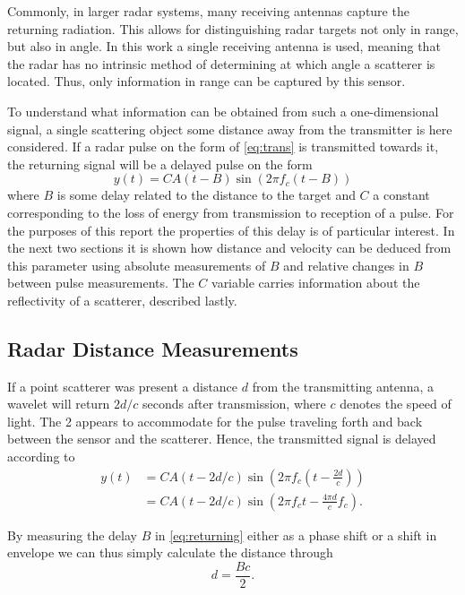 Commonly, in larger radar systems, many receiving antennas capture the returning radiation. This allows for distinguishing radar targets not only in range, but also in angle. In this work a single receiving antenna is used, meaning that the radar has no intrinsic method of determining at which angle a scatterer is located. Thus, only information in range can be captured by this sensor.

To understand what information can be obtained from such a one-dimensional signal, a single scattering object some distance away from the transmitter is here considered. If a radar pulse on the form of \eqref{eq:trans} is transmitted towards it, the returning signal will be a delayed pulse on the form \citep{richards_2014}
\begin{equation}\label{eq:returning}
	y(t) = CA(t-B)\sin(2\pi f_c (t-B))
\end{equation}
where $B$ is some delay related to the distance to the target and $C$ a constant corresponding to the loss of energy from transmission to reception of a pulse. For the purposes of this report the properties of this delay is of particular interest. In the next two sections it is shown how distance and velocity can be deduced from this parameter using absolute measurements of $B$ and relative changes in $B$ between pulse measurements. The $C$ variable carries information about the reflectivity of a scatterer, described lastly. 

\subsection{Radar Distance Measurements}

If a point scatterer was present a distance $d$ from the transmitting antenna, a wavelet will return $2d/c$ seconds after transmission, where $c$ denotes the speed of light. The 2 appears to accommodate for the pulse traveling forth and back between the sensor and the scatterer. Hence, the transmitted signal is delayed according to 
\begin{equation}
	\begin{split}
		y(t) 
		& = CA(t-2d/c)\sin(2\pi f_c(t - \frac{2d}{c})) \\
		& = CA(t-2d/c)\sin(2\pi f_ct - \frac{4\pi d}{c}f_c).
	\end{split}
\end{equation}

By measuring the delay $B$ in \eqref{eq:returning} either as a phase shift or a shift in envelope we can thus simply calculate the distance through
\begin{equation}
	d = \frac{Bc}{2}.
\end{equation}


